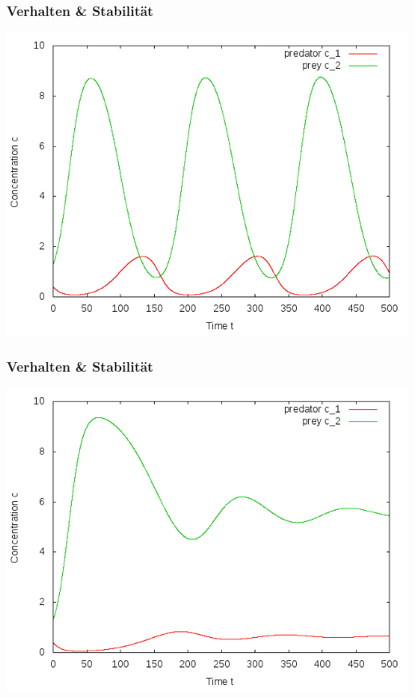 \documentclass[12pt]{beamer}
\begin{document}
    \begin{frame}
    \frametitle{Verhalten \& Stabilität}
    \includegraphics[scale=0.5]{n2_unged_schwingungen.png}
    \end{frame}
    
    \begin{frame}
    \frametitle{Verhalten \& Stabilität}
    \includegraphics[scale=0.5]{n2_ged_schwingungen.png}
    \end{frame}
    
\end{document}
